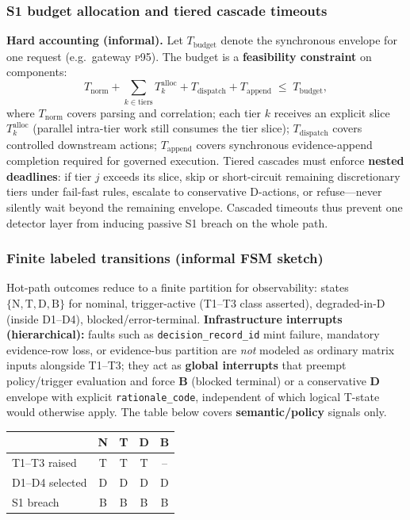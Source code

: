 \documentclass[11pt,a4paper]{report}
\begin{document}
\subsubsection*{S1 budget allocation and tiered cascade timeouts}
\textbf{Hard accounting (informal).} Let $T_{\mathrm{budget}}$ denote the synchronous envelope for one request (e.g.\ gateway \textsc{p95}). The budget is a \textbf{feasibility constraint} on components:
\[
  T_{\mathrm{norm}} + \sum_{k \in \mathrm{tiers}} T_k^{\mathrm{alloc}} + T_{\mathrm{dispatch}} + T_{\mathrm{append}} \;\le\; T_{\mathrm{budget}},
\]
where $T_{\mathrm{norm}}$ covers parsing and correlation; each tier $k$ receives an explicit slice $T_k^{\mathrm{alloc}}$ (parallel intra-tier work still consumes the tier slice); $T_{\mathrm{dispatch}}$ covers controlled downstream actions; $T_{\mathrm{append}}$ covers synchronous evidence-append completion required for governed execution. Tiered cascades must enforce \textbf{nested deadlines}: if tier $j$ exceeds its slice, skip or short-circuit remaining discretionary tiers under fail-fast rules, escalate to conservative D-actions, or refuse---never silently wait beyond the remaining envelope. Cascaded timeouts thus prevent one detector layer from inducing passive S1 breach on the whole path.

\subsubsection*{Finite labeled transitions (informal FSM sketch)}
Hot-path outcomes reduce to a finite partition for observability: states \(\{\mathrm{N},\mathrm{T},\mathrm{D},\mathrm{B}\}\) for nominal, trigger-active (T1--T3 class asserted), degraded-in-D (inside D1--D4), blocked/error-terminal. \textbf{Infrastructure interrupts (hierarchical):} faults such as \texttt{decision\_record\_id} mint failure, mandatory evidence-row loss, or evidence-bus partition are \emph{not} modeled as ordinary matrix inputs alongside T1--T3; they act as \textbf{global interrupts} that preempt policy/trigger evaluation and force \textbf{B} (blocked terminal) or a conservative \textbf{D} envelope with explicit \texttt{rationale\_code}, independent of which logical T-state would otherwise apply. The table below covers \textbf{semantic/policy} signals only.

\begin{center}
\footnotesize
\begin{tabular}{@{}lcccc@{}}
\toprule
 & N & T & D & B \\
\midrule
T1--T3 raised & T & T & T & -- \\
D1--D4 selected & D & D & D & D \\
S1 breach & B & B & B & B \\
\bottomrule
\end{tabular}
\end{center}
\end{document}
